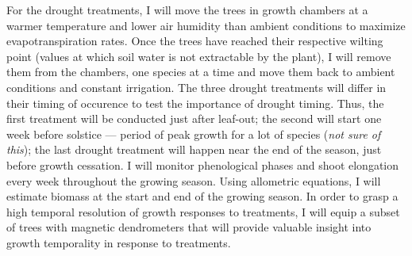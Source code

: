 \documentclass[12pt]{article}
\begin{document}
For the drought treatments, I will move the trees in growth chambers at a warmer temperature and lower air humidity than ambient conditions to maximize evapotranspiration rates. Once the trees have reached their respective wilting point (values at which soil water is not extractable by the plant), I will remove them from the chambers, one species at a time and move them back to ambient conditions and constant irrigation. The three drought treatments will differ in their timing of occurence to test the importance of drought timing. Thus, the first treatment will be conducted just after leaf-out; the second will start one week before solstice --- period of peak growth for a lot of species (\textit{not sure of this}); the last drought treatment will happen near the end of the season, just before growth cessation. I will monitor phenological phases and shoot elongation every week throughout the growing season. Using allometric equations, I will estimate biomass at the start and end of the growing season. In order to grasp a high temporal resolution of growth responses to treatments, I will equip a subset of trees with magnetic dendrometers that will provide valuable insight into growth temporality in response to treatments. \\
\end{document}
